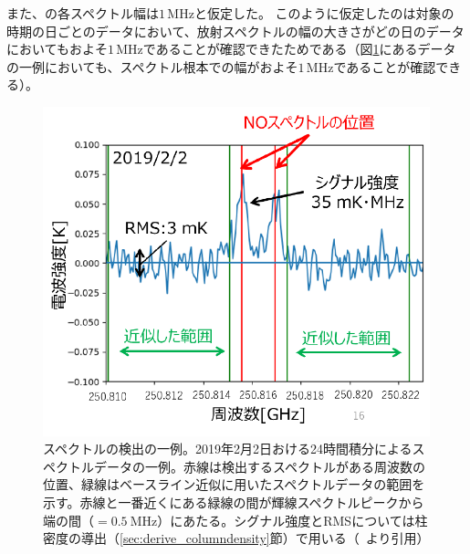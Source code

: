 また、の各スペクトル幅は$1\, \mathrm{MHz}$と仮定した。
このように仮定したのは対象の時期の日ごとのデータにおいて、放射スペクトルの幅の大きさがどの日のデータにおいてもおよそ$1\, \mathrm{MHz}$であることが確認できたためである（図\ref{fig:no_spectr_exp}にあるデータの一例においても、スペクトル根本での幅がおよそ$1\, \mathrm{MHz}$であることが確認できる）。
\begin{figure}[htbp]
    \centering
    \includegraphics[width=\linewidth]{master_thesis_contents/master_thesis_fig/no_spectr_exp.pdf}
    \caption{スペクトルの検出の一例。2019年2月2日おける24時間積分によるスペクトルデータの一例。赤線は検出するスペクトルがある周波数の位置、緑線はベースライン近似に用いたスペクトルデータの範囲を示す。赤線と一番近くにある緑線の間が輝線スペクトルピークから端の間（$=0.5\ \mathrm{MHz}$）にあたる。シグナル強度とRMSについては柱密度の導出（\ref{sec:derive_columndensity}節）で用いる（~\cite{goto2021bachelor}より引用）}
    \label{fig:no_spectr_exp}
\end{figure}
\clearpage


